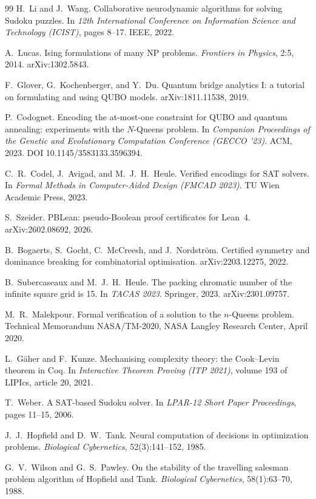 \documentclass{easychair}
\begin{document}
\begin{thebibliography}{99}
H.~Li and J.~Wang.
\newblock Collaborative neurodynamic algorithms for solving Sudoku puzzles.
\newblock In \emph{12th International Conference on Information Science and Technology (ICIST)},
pages 8--17. IEEE, 2022.

A.~Lucas.
\newblock Ising formulations of many NP problems.
\newblock \emph{Frontiers in Physics}, 2:5, 2014. arXiv:1302.5843.

F.~Glover, G.~Kochenberger, and Y.~Du.
\newblock Quantum bridge analytics I: a tutorial on formulating and using QUBO models.
\newblock arXiv:1811.11538, 2019.

P.~Codognet.
\newblock Encoding the at-most-one constraint for QUBO and quantum annealing: experiments with the
$N$-Queens problem.
\newblock In \emph{Companion Proceedings of the Genetic and Evolutionary Computation Conference
(GECCO '23)}. ACM, 2023. DOI 10.1145/3583133.3596394.

C.~R.~Codel, J.~Avigad, and M.~J.~H.~Heule.
\newblock Verified encodings for SAT solvers.
\newblock In \emph{Formal Methods in Computer-Aided Design (FMCAD 2023)}. TU Wien Academic Press, 2023.

S.~Szeider.
\newblock PBLean: pseudo-Boolean proof certificates for Lean~4.
\newblock arXiv:2602.08692, 2026.

B.~Bogaerts, S.~Gocht, C.~McCreesh, and J.~Nordstr\"{o}m.
\newblock Certified symmetry and dominance breaking for combinatorial optimisation.
\newblock arXiv:2203.12275, 2022.

B.~Subercaseaux and M.~J.~H.~Heule.
\newblock The packing chromatic number of the infinite square grid is 15.
\newblock In \emph{TACAS 2023}. Springer, 2023. arXiv:2301.09757.

M.~R.~Malekpour.
\newblock Formal verification of a solution to the $n$-Queens problem.
\newblock Technical Memorandum NASA/TM-2020, NASA Langley Research Center, April 2020.

L.~G\"{a}her and F.~Kunze.
\newblock Mechanising complexity theory: the Cook--Levin theorem in Coq.
\newblock In \emph{Interactive Theorem Proving (ITP 2021)}, volume 193 of LIPIcs, article 20, 2021.

T.~Weber.
\newblock A SAT-based Sudoku solver.
\newblock In \emph{LPAR-12 Short Paper Proceedings}, pages 11--15, 2006.

J.~J.~Hopfield and D.~W.~Tank.
\newblock Neural computation of decisions in optimization problems.
\newblock \emph{Biological Cybernetics}, 52(3):141--152, 1985.

G.~V.~Wilson and G.~S.~Pawley.
\newblock On the stability of the travelling salesman problem algorithm of Hopfield and Tank.
\newblock \emph{Biological Cybernetics}, 58(1):63--70, 1988.

\end{thebibliography}
\end{document}
